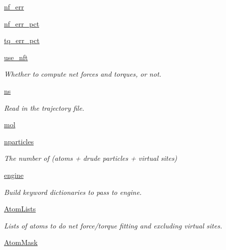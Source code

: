 \begin{DoxyCompactItemize}
\hyperlink{classforcebalance_1_1abinitio_1_1AbInitio_a89de620e9aa500481c9e1ded99e14f72}{nf\-\_\-err}
\item 
\hyperlink{classforcebalance_1_1abinitio_1_1AbInitio_a184edac2cb27a999c363595ea59d8163}{nf\-\_\-err\-\_\-pct}
\item 
\hyperlink{classforcebalance_1_1abinitio_1_1AbInitio_a184f2a783b2710f6f75842afdeccf14e}{tq\-\_\-err\-\_\-pct}
\item 
\hyperlink{classforcebalance_1_1abinitio_1_1AbInitio_afd8d179560a295ffa6c6309843c59279}{use\-\_\-nft}
\begin{DoxyCompactList}\small\item\em Whether to compute net forces and torques, or not. \end{DoxyCompactList}\item 
\hyperlink{classforcebalance_1_1abinitio_1_1AbInitio_a1e8248e2efe952362b1b21462a70b540}{ns}
\begin{DoxyCompactList}\small\item\em Read in the trajectory file. \end{DoxyCompactList}\item 
\hyperlink{classforcebalance_1_1abinitio_1_1AbInitio_ace30686ab072c0520154d15855c5e885}{mol}
\item 
\hyperlink{classforcebalance_1_1abinitio_1_1AbInitio_aef3798e4666b91ecc4c526b679eb4908}{nparticles}
\begin{DoxyCompactList}\small\item\em The number of (atoms + drude particles + virtual sites) \end{DoxyCompactList}\item 
\hyperlink{classforcebalance_1_1abinitio_1_1AbInitio_a34058fdf49b7b3b8f1fea78dd30f3209}{engine}
\begin{DoxyCompactList}\small\item\em Build keyword dictionaries to pass to engine. \end{DoxyCompactList}\item 
\hyperlink{classforcebalance_1_1abinitio_1_1AbInitio_a7e62a74e820ac0c5dd67f49155b95c41}{Atom\-Lists}
\begin{DoxyCompactList}\small\item\em Lists of atoms to do net force/torque fitting and excluding virtual sites. \end{DoxyCompactList}\item 
\hyperlink{classforcebalance_1_1abinitio_1_1AbInitio_a09c8bbc29d2de7dbc471d56cbc574d5d}{Atom\-Mask}
\item 

\end{DoxyCompactItemize}
